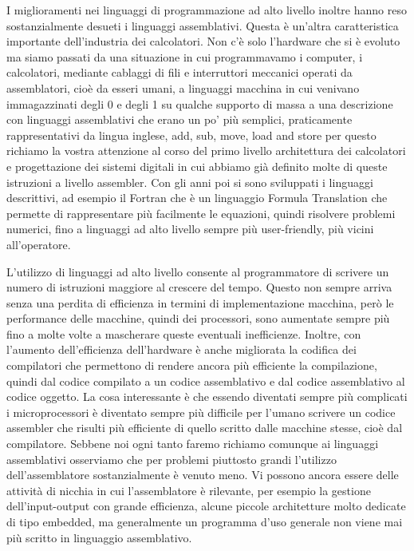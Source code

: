 I miglioramenti nei linguaggi di programmazione ad alto livello inoltre hanno reso sostanzialmente desueti i linguaggi assemblativi.
Questa è un'altra caratteristica importante dell'industria dei calcolatori.
Non c'è solo l'hardware che si è evoluto ma siamo passati da una situazione in cui programmavamo i computer, i calcolatori, mediante cablaggi di fili e interruttori meccanici operati da assemblatori, cioè da esseri umani, a linguaggi macchina in cui venivano immagazzinati degli 0 e degli 1 su qualche supporto di massa a una descrizione con linguaggi assemblativi che erano un po' più semplici, praticamente rappresentativi da lingua inglese, add, sub, move, load and store per questo richiamo la vostra attenzione al corso del primo livello architettura dei calcolatori e progettazione dei sistemi digitali in cui abbiamo già definito molte di queste istruzioni a livello assembler.
Con gli anni poi si sono sviluppati i linguaggi descrittivi, ad esempio il Fortran che è un linguaggio Formula Translation che permette di rappresentare più facilmente le equazioni, quindi risolvere problemi numerici, fino a linguaggi ad alto livello sempre più user-friendly, più vicini all'operatore.

L'utilizzo di linguaggi ad alto livello consente al programmatore di scrivere un numero di istruzioni maggiore al crescere del tempo.
Questo non sempre arriva senza una perdita di efficienza in termini di implementazione macchina, però le performance delle macchine, quindi dei processori, sono aumentate sempre più fino a molte volte a mascherare queste eventuali inefficienze.
Inoltre, con l'aumento dell'efficienza dell'hardware è anche migliorata la codifica dei compilatori che permettono di rendere ancora più efficiente la compilazione, quindi dal codice compilato a un codice assemblativo e dal codice assemblativo al codice oggetto.
La cosa interessante è che essendo diventati sempre più complicati i microprocessori è diventato sempre più difficile per l'umano scrivere un codice assembler che risulti più efficiente di quello scritto dalle macchine stesse, cioè dal compilatore.
Sebbene noi ogni tanto faremo richiamo comunque ai linguaggi assemblativi osserviamo che per problemi piuttosto grandi l'utilizzo dell'assemblatore sostanzialmente è venuto meno.
Vi possono ancora essere delle attività di nicchia in cui l'assemblatore è rilevante, per esempio la gestione dell'input-output con grande efficienza, alcune piccole architetture molto dedicate di tipo embedded, ma generalmente un programma d'uso generale non viene mai più scritto in linguaggio assemblativo.


